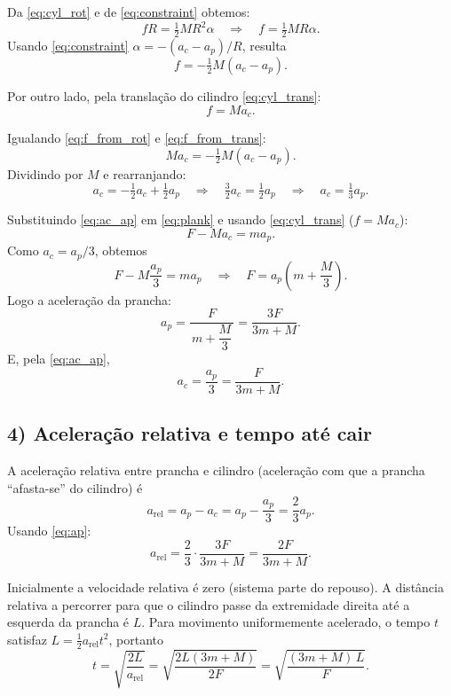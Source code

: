 \documentclass[a4paper,12pt]{article}
\begin{document}
\begin{flushleft}
Da \eqref{eq:cyl_rot} e de \eqref{eq:constraint} obtemos:
\[
fR = \tfrac{1}{2}MR^{2}\alpha \quad\Rightarrow\quad f = \tfrac{1}{2}M R \alpha.
\]
Usando \eqref{eq:constraint} $\alpha = -(a_c - a_p)/R$, resulta
\begin{equation}\label{eq:f_from_rot}
f = -\tfrac{1}{2}M (a_c - a_p).
\end{equation}

Por outro lado, pela translação do cilindro \eqref{eq:cyl_trans}:
\begin{equation}\label{eq:f_from_trans}
f = M a_c.
\end{equation}

Igualando \eqref{eq:f_from_rot} e \eqref{eq:f_from_trans}:
\[
M a_c = -\tfrac{1}{2}M (a_c - a_p).
\]
Dividindo por $M$ e rearranjando:
\[
a_c = -\tfrac{1}{2}a_c + \tfrac{1}{2}a_p
\quad\Rightarrow\quad
\tfrac{3}{2}a_c = \tfrac{1}{2}a_p
\quad\Rightarrow\quad
a_c = \tfrac{1}{3} a_p. \label{eq:ac_ap}
\]

Substituindo \eqref{eq:ac_ap} em \eqref{eq:plank} e usando \eqref{eq:cyl_trans} ($f=M a_c$):
\[
F - M a_c = m a_p.
\]
Como $a_c = a_p/3$, obtemos
\[
F - M\frac{a_p}{3} = m a_p
\quad\Rightarrow\quad
F = a_p\!\left(m + \frac{M}{3}\right).
\]
Logo a aceleração da prancha:
\begin{equation}\label{eq:ap}
a_p = \frac{F}{\,m + \dfrac{M}{3}\,} = \frac{3F}{3m+M}.
\end{equation}
E, pela \eqref{eq:ac_ap},
\begin{equation}\label{eq:ac}
a_c = \frac{a_p}{3} = \frac{F}{3m+M}.
\end{equation}

\subsection*{4) Aceleração relativa e tempo até cair}

A aceleração relativa entre prancha e cilindro (aceleração com que a prancha “afasta-se” do cilindro) é
\[
a_{\text{rel}} = a_p - a_c = a_p - \frac{a_p}{3} = \frac{2}{3}a_p.
\]
Usando \eqref{eq:ap}:
\begin{equation}\label{eq:arel}
a_{\text{rel}} = \frac{2}{3}\cdot\frac{3F}{3m+M} = \frac{2F}{3m+M}.
\end{equation}

Inicialmente a velocidade relativa é zero (sistema parte do repouso). A distância relativa a percorrer para que
o cilindro passe da extremidade direita até a esquerda da prancha é $L$. Para movimento uniformemente acelerado,
o tempo $t$ satisfaz $L = \tfrac{1}{2} a_{\text{rel}} t^{2}$, portanto
\begin{equation}\label{eq:time_general}
t = \sqrt{\frac{2L}{a_{\text{rel}}}} = \sqrt{\frac{2L(3m+M)}{2F}} = \sqrt{\frac{(3m+M)\,L}{F}}.
\end{equation}


\end{flushleft}
\end{document}
